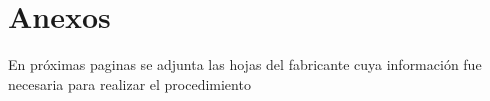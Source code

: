  \section{Anexos}
En próximas paginas se adjunta las hojas del fabricante cuya información fue necesaria para realizar el procedimiento 



